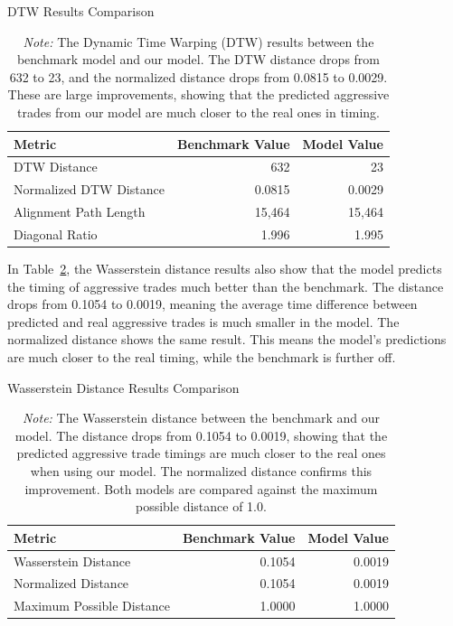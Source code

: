 \begin{table}[tbp]
    \centering
    \caption{DTW Results Comparison} \label{tb:dtw_com}
    \caption*{\textit{Note:} The Dynamic Time Warping (DTW) results between the benchmark model and our model. The DTW distance drops from 632 to 23, and the normalized distance drops from 0.0815 to 0.0029. These are large improvements, showing that the predicted aggressive trades from our model are much closer to the real ones in timing.}
    \begin{tabular}{lrr}
    \toprule
    Metric & Benchmark Value & Model Value\\
    \midrule
    DTW Distance & 632 & 23 \\  %
    Normalized DTW Distance & 0.0815 & 0.0029 \\  %
    Alignment Path Length & 15,464 & 15,464 \\
    Diagonal Ratio & 1.996 & 1.995 \\   %
    \bottomrule
    \end{tabular}
\end{table}

In Table~\ref{tb:wasserstein_com}, the Wasserstein distance results also show that the model predicts the timing of aggressive trades much better than the benchmark. The distance drops from 0.1054 to 0.0019, meaning the average time difference between predicted and real aggressive trades is much smaller in the model. The normalized distance shows the same result. This means the model's predictions are much closer to the real timing, while the benchmark is further off.
\begin{table}[tbp]
    \centering
    \caption{Wasserstein Distance Results Comparison}
    \caption*{\textit{Note:} The Wasserstein distance between the benchmark and our model. The distance drops from 0.1054 to 0.0019, showing that the predicted aggressive trade timings are much closer to the real ones when using our model. The normalized distance confirms this improvement. Both models are compared against the maximum possible distance of 1.0.}

    \label{tb:wasserstein_com}
    \begin{tabular}{lrr}
    \toprule
    Metric & Benchmark Value & Model Value\\
    \midrule
    Wasserstein Distance & 0.1054 & 0.0019 \\  %
    Normalized Distance & 0.1054 & 0.0019 \\  %
    Maximum Possible Distance & 1.0000 & 1.0000 \\
    \bottomrule
    \end{tabular}
\end{table}

